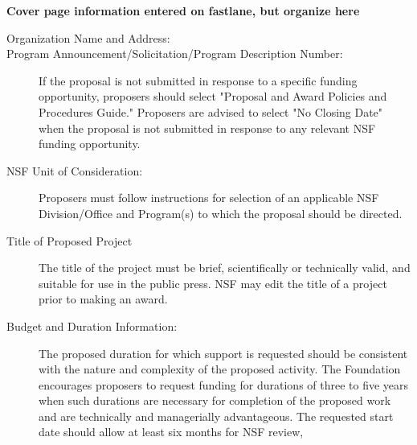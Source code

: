 \begin{pappg}
    \textbf{Cover page information entered
    on fastlane, but organize here}
\end{pappg}
\begin{description}
    \item[Organization Name and Address:] \quad
    \item[Program
            Announcement/Solicitation/Program
        Description Number:]  \quad
        \begin{pappg}
            If the proposal is not submitted
            in response to a specific
            funding opportunity,
            proposers should select
            "Proposal and Award Policies and
            Procedures Guide." Proposers are
            advised to
            select "No Closing Date" when
            the proposal is not submitted in
            response to any relevant NSF
            funding
            opportunity.
        \end{pappg}
    \item[NSF Unit of Consideration:]  \quad
        \begin{pappg}
            Proposers must follow
            instructions for selection of an
            applicable NSF Division/Office
            and Program(s) to
            which the proposal should be
            directed.
        \end{pappg}
    \item[Title of Proposed Project]  \quad
        \begin{pappg}
            The title of the project must be
            brief, scientifically or
            technically valid, and suitable
            for use in the public
            press. NSF may edit the title of
            a project prior to making an
            award.
        \end{pappg}
    \item[Budget and Duration
        Information:]  \quad
        \begin{pappg}
            The proposed duration for which support is requested
            should be consistent with the nature and complexity
            of the proposed activity. The Foundation encourages
            proposers to request funding for durations of three
            to five years when such durations are necessary for
            completion of the proposed work and are technically
            and managerially advantageous. The requested start
            date should allow at least six months for NSF review,

\end{pappg}
\end{description}
